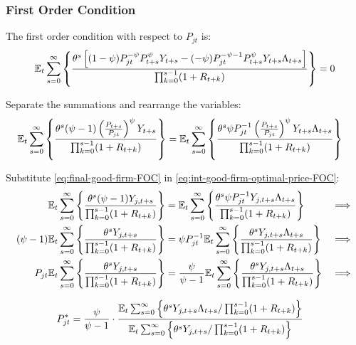 \documentclass[
	thesis.tex
	]{subfiles}
\begin{document}

\subsubsection*{First Order Condition}

The first order condition with respect to $P_{jt}$ is:
\begin{align}
	& \quad {\mathbb{E}_{t}} \sum_{s=0}^{\infty} \left\{ \frac{\theta^s \left[ (1-\psi) P_{jt}^{-\psi} P_{t+s}^{\psi} Y_{t+s} - (-\psi) P_{jt}^{-\psi-1} P_{t+s}^{\psi} Y_{t+s} \Lambda_{t+s} \right] }{\prod_{k=0}^{s-1}(1+R_{t+k})} \right\} = 0 \nonumber
\end{align}


Separate the summations and rearrange the variables:
\begin{align}
	\label{eq:int-good-firm-optimal-price-FOC}
	& {\mathbb{E}_{t}} \sum_{s=0}^{\infty} \left\{ \frac{\theta^s (\psi-1) \left( \frac{P_{t+s}} {P_{jt}} \right)^{\psi} Y_{t+s}} {\prod_{k=0}^{s-1} (1+R_{t+k})} \right\} = {\mathbb{E}_{t}} \sum_{s=0}^{\infty} \left\{ \frac{\theta^s \psi P_{jt}^{-1} \left( \frac{P_{t+s}} {P_{jt}} \right)^{\psi} Y_{t+s} \Lambda_{t+s} }{\prod_{k=0}^{s-1}(1+R_{t+k})} \right\}
\end{align}


Substitute \ref{eq:final-good-firm-FOC} in \ref{eq:int-good-firm-optimal-price-FOC}:
\begin{alignat}{2}
	{\mathbb{E}_{t}} \sum_{s=0}^{\infty} \Bigg\{ \frac{\theta^s (\psi-1) Y_{j,t+s}}{\prod_{k=0}^{s-1}(1+R_{t+k})} \Bigg\} &= {\mathbb{E}_{t}} \sum_{s=0}^{\infty} \Bigg\{ \frac{\theta^s \psi P_{jt}^{-1} Y_{j,t+s} \Lambda_{t+s}}{\prod_{k=0}^{s-1}(1+R_{t+k})}  \Bigg\} &\implies \nonumber \\
	(\psi-1) {\mathbb{E}_{t}} \sum_{s=0}^{\infty} \Bigg\{ \frac{\theta^s Y_{j,t+s}}{\prod_{k=0}^{s-1}(1+R_{t+k})} \Bigg\} &= \psi P_{jt}^{-1} {\mathbb{E}_{t}} \sum_{s=0}^{\infty} \Bigg\{ \frac{\theta^s Y_{j,t+s} \Lambda_{t+s}}{\prod_{k=0}^{s-1}(1+R_{t+k})}  \Bigg\} &\implies \nonumber \\
	P_{jt} {\mathbb{E}_{t}} \sum_{s=0}^{\infty} \Bigg\{ \frac{\theta^s Y_{j,t+s}}{\prod_{k=0}^{s-1}(1+R_{t+k})} \Bigg\} &= \frac{\psi}{\psi-1} {\mathbb{E}_{t}} \sum_{s=0}^{\infty} \Bigg\{ \frac{\theta^s Y_{j,t+s} \Lambda_{t+s}}{\prod_{k=0}^{s-1}(1+R_{t+k})}  \Bigg\} &\implies \nonumber
\end{alignat}

\vspace*{-1cm}

\begin{align}
	\label{eq:int-good-firm-optimal-price-FOC-2}
	P_{jt}^\ast &= 
	\frac{\psi}{\psi-1} \cdot
	\frac{
		{\mathbb{E}_{t}} \sum_{s=0}^{\infty} \left\{ 
		\theta^s Y_{j,t+s} \Lambda_{t+s} / \prod_{k=0}^{s-1}(1+R_{t+k}) \right\} } {{\mathbb{E}_{t}} \sum_{s=0}^{\infty} \left\{
		\theta^s Y_{j,t+s} / \prod_{k=0}^{s-1}(1+R_{t+k}) \right\}}
\end{align}
\end{document}
